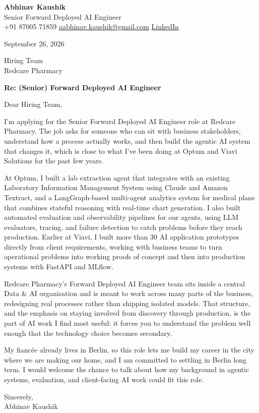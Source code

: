 \documentclass[11pt,a4paper]{article}
\begin{document}
{\Large\bfseries Abhinav Kaushik}\\
Senior Forward Deployed AI Engineer\\
+91 87005 71859 \textbar{} \href{mailto:aabhinav.kaushik@gmail.com}{aabhinav.kaushik@gmail.com} \textbar{} \href{https://linkedin.com/in/abhinav-kaushik10/}{LinkedIn}  

September 26, 2026

Hiring Team\\
Redcare Pharmacy

\textbf{Re: (Senior) Forward Deployed AI Engineer}

Dear Hiring Team,

I'm applying for the Senior Forward Deployed AI Engineer role at Redcare Pharmacy. The job asks for someone who can sit with business stakeholders, understand how a process actually works, and then build the agentic AI system that changes it, which is close to what I've been doing at Optum and Viavi Solutions for the past few years.

At Optum, I built a lab extraction agent that integrates with an existing Laboratory Information Management System using Claude and Amazon Textract, and a LangGraph-based multi-agent analytics system for medical plans that combines stateful reasoning with real-time chart generation. I also built automated evaluation and observability pipelines for our agents, using LLM evaluators, tracing, and failure detection to catch problems before they reach production. Earlier at Viavi, I built more than 30 AI application prototypes directly from client requirements, working with business teams to turn operational problems into working proofs of concept and then into production systems with FastAPI and MLflow.

Redcare Pharmacy's Forward Deployed AI Engineer team sits inside a central Data \& AI organisation and is meant to work across many parts of the business, redesigning real processes rather than shipping isolated models. That structure, and the emphasis on staying involved from discovery through production, is the part of AI work I find most useful: it forces you to understand the problem well enough that the technology choice becomes secondary.

My fiancée already lives in Berlin, so this role lets me build my career in the city where we are making our home, and I am committed to settling in Berlin long term. I would welcome the chance to talk about how my background in agentic systems, evaluation, and client-facing AI work could fit this role.

Sincerely,\\[4pt]
Abhinav Kaushik
\end{document}
